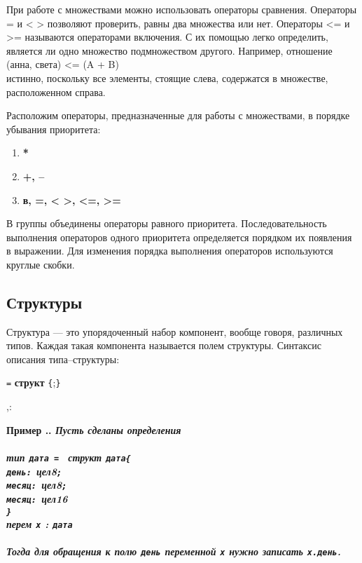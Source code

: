 \documentclass[10pt]{report}
\newcounter{exam}[section]
\renewcommand{\theexam}{\thesection.\arabic{exam}}
\newenvironment{Example}{\par\refstepcounter{exam}\bf Пример \theexam. \sl}{\rm\par}
\begin{document}
При работе с множествами можно использовать операторы сравнения. Операторы = и < > позволяют проверить, равны два множества или нет. Операторы <= и >= называются операторами включения. С их помощью легко определить, является ли одно множество подмножеством другого. 
Например, отношение \\
\hspace*{5mm} (анна, света) <= (A + B) \\
истинно, поскольку все элементы, стоящие слева, содержатся в множестве, расположенном справа.

Расположим операторы, предназначенные для работы с множествами, в порядке убывания приоритета:

\begin{enumerate}
\item
\textbf{*}\\
\item
\textbf{+, --}\\
\item
\textbf{в, =, < >, <=, >=}\\
\end{enumerate}
В группы объединены операторы равного приоритета. Последовательность выполнения операторов одного приоритета определяется порядком их появления в выражении. Для изменения порядка выполнения операторов используются круглые скобки.


\subsection{Структуры}
Структура --- это упорядоченный набор компонент, вообще говоря, различных типов. Каждая такая компонента называется полем структуры. Синтаксис описания типа--структуры:

 \texttt{=} \textbf{структ}  \texttt{\{}\rbo;\rbc\kleene\texttt{\}}

\is{}\rbo,\rbc\kleene:

\is{}

\begin{Example} \textit{Пусть сделаны определения}\\
	\\
	\rm
	\textbf{тип} \texttt{дата = } \textbf{структ} \texttt{дата\{}\\
	\hspace*{27mm}\texttt{день: }\textbf{цел8}\texttt{;}\\
	\hspace*{27mm}\texttt{месяц: }\textbf{цел8}\texttt{;}\\
	\hspace*{27mm}\texttt{месяц: }\textbf{цел16}\\
	\hspace*{8mm}\texttt{\}}
	\\
	\textbf{перем} \texttt{x} : \texttt{дата}\\
	\\
	\textit{Тогда для обращения к полю \texttt{день} переменной \texttt{x} нужно записать \texttt{x.день}.}
\end{Example}
\end{document}
